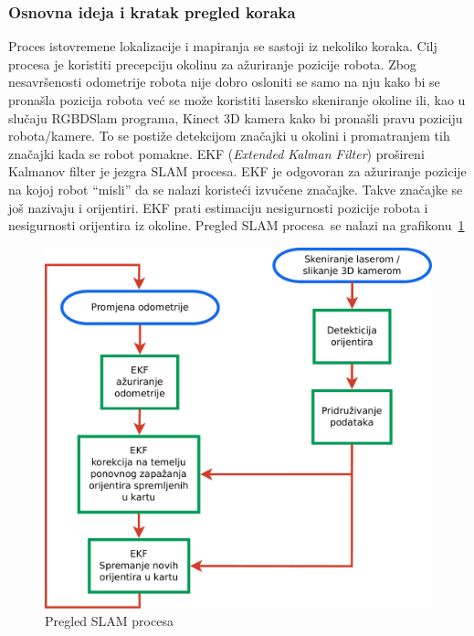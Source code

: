 \subsubsection{Osnovna ideja i kratak pregled koraka} %
\label{ssub:Osnovna ideja }
Proces istovremene lokalizacije i mapiranja se sastoji iz nekoliko
koraka. Cilj procesa je koristiti precepciju okolinu za ažuriranje pozicije robota.
Zbog nesavršenosti odometrije robota nije dobro osloniti se samo na nju
kako bi se pronašla pozicija robota već se može koristiti lasersko
skeniranje okoline ili, kao u slučaju RGBDSlam programa, Kinect 3D kamera
kako bi pronašli pravu poziciju robota/kamere. To se postiže
detekcijom značajki u okolini i promatranjem tih značajki kada se
robot pomakne. EKF (\textit{Extended Kalman Filter}) prošireni Kalmanov
filter je jezgra SLAM procesa. EKF je odgovoran za ažuriranje pozicije
na kojoj robot ``misli'' da se nalazi koristeći izvučene značajke. Takve
značajke se još nazivaju i orijentiri. EKF prati estimaciju nesigurnosti
pozicije robota i nesigurnosti orijentira iz okoline. Pregled SLAM
procesa~\footnotemark[1] se nalazi na grafikonu~\ref{fig:slam-overview.pdf}  


\begin{figure}[h]
\renewcommand{\figurename}{Grafikon}
\centering
\includegraphics[scale=0.4]{figures/slam-overview.pdf}
\caption{Pregled SLAM procesa}
\label{fig:slam-overview.pdf}
\end{figure}

